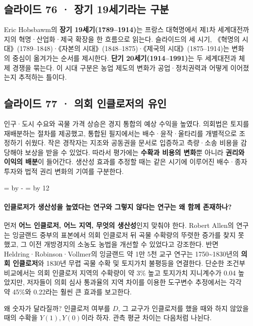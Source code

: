 \documentclass[10pt,a4paper]{article}
\newcommand{\ReserveQuestionSpace}{%
  \par\begingroup
  \dimen0=\pagegoal \advance\dimen0 by -\pagetotal
  \dimen2=\baselineskip \multiply\dimen2 by 12
  \ifdim\dimen0<\dimen2 \newpage\fi
  \endgroup}
\begin{document}
\subsection{슬라이드 76 · 장기 19세기라는 구분}
Eric Hobsbawm의 \textbf{장기 19세기(1789–1914)}는 프랑스 대혁명에서 제1차 세계대전까지의 혁명·산업화·제국 확장을 한 흐름으로 읽는다. 슬라이드의 세 시기, 《혁명의 시대》(1789–1848)·《자본의 시대》(1848–1875)·《제국의 시대》(1875–1914)는 변화의 중심이 옮겨가는 순서를 제시한다. \textbf{단기 20세기(1914–1991)}는 두 세계대전과 체제 경쟁을 묶는다. 이 시대 구분은 농업 제도의 변화가 공업·정치권력과 어떻게 이어졌는지 추적하는 틀이다.\par

\subsection{슬라이드 77 · 의회 인클로저의 유인}
인구·도시 수요와 곡물 가격 상승은 경지 통합의 예상 수익을 높였다. 의회법은 토지를 재배분하는 절차를 제공했고, 통합된 필지에서는 배수·윤작·울타리를 개별적으로 조정하기 쉬웠다. 작은 경작자는 지조와 공동권을 문서로 입증하고 측량·소송 비용을 감당해야 보상을 받을 수 있었다. 따라서 평가에는 \textbf{수확과 비용의 변화}뿐 아니라 \textbf{권리와 이익의 배분}이 들어간다. 생산성 효과를 추정할 때는 같은 시기에 이루어진 배수·종자 투자와 법적 권리 변화의 기여를 구분한다.\par

\ReserveQuestionSpace
\paragraph{인클로저가 생산성을 높였다는 연구와 그렇지 않다는 연구는 왜 함께 존재하나?}
먼저 \textbf{어느 인클로저, 어느 지역, 무엇의 생산성}인지 맞춰야 한다. Robert Allen의 연구는 잉글랜드 중부의 표본에서 의회 인클로저 뒤 곡물 수확량의 뚜렷한 증가를 찾지 못했고, 그 이전 개방경지의 소농도 농법을 개선할 수 있었다고 강조한다. 반면 Heldring·Robinson·Vollmer의 잉글랜드 약 1만 5천 교구 연구는 1750\textasciitilde{}1830년의 \textbf{의회 인클로저}와 1830년 무렵 곡물 수확 및 토지가치 불평등을 연결한다. 단순한 조건부 비교에서는 의회 인클로저 지역의 수확량이 약 3\% 높고 토지가치 지니계수가 0.04 높았지만, 저자들이 의회 심사 통과율의 지역 차이를 이용한 도구변수 추정에서는 각각 약 45\%와 0.22라는 훨씬 큰 효과를 보고한다.\par

왜 숫자가 달라질까? 인클로저 여부를 $D$, 그 교구가 인클로저를 했을 때와 하지 않았을 때의 수확을 $Y(1),Y(0)$이라 하자. 관측 평균 차이는 다음처럼 나뉜다.\par
\end{document}
